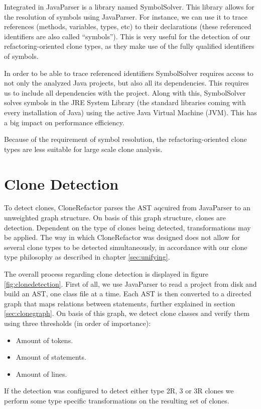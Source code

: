 Integrated in JavaParser is a library named SymbolSolver. This library allows for the resolution of symbols using JavaParser. For instance, we can use it to trace references (methods, variables, types, etc) to their declarations (these referenced identifiers are also called ``symbols''). This is very useful for the detection of our refactoring-oriented clone types, as they make use of the fully qualified identifiers of symbols.

In order to be able to trace referenced identifiers SymbolSolver requires access to not only the analyzed Java projects, but also all its dependencies. This requires us to include all dependencies with the project. Along with this, SymbolSolver solves symbols in the JRE System Library (the standard libraries coming with every installation of Java) using the active Java Virtual Machine (JVM). This has a big impact on performance efficiency.

Because of the requirement of symbol resolution, the refactoring-oriented clone types are less suitable for large scale clone analysis.

\section{Clone Detection}\label{sec:clonedetection}
To detect clones, CloneRefactor parses the AST aqcuired from JavaParser to an unweighted graph structure. On basis of this graph structure, clones are detection. Dependent on the type of clones being detected, transformations may be applied. The way in which CloneRefactor was designed does not allow for several clone types to be detected simultaneously, in accordance with our clone type philosophy as described in chapter \ref{sec:unifying}.

The overall process regarding clone detection is displayed in figure \ref{fig:clonedetection}. First of all, we use JavaParser to read a project from disk and build an AST, one class file at a time. Each AST is then converted to a directed graph that maps relations between statements, further explained in section \ref{sec:clonegraph}. On basis of this graph, we detect clone classes and verify them using three thresholds (in order of importance):
\begin{itemize}
  \item Amount of tokens.
  \item Amount of statements.
  \item Amount of lines.
\end{itemize}
If the detection was configured to detect either type 2R, 3 or 3R clones we perform some type specific transformations on the resulting set of clones.

